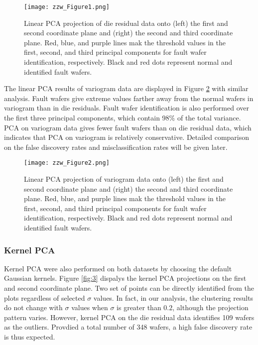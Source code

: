 \documentclass[12pt]{article}
\numberwithin{equation}{section}
\numberwithin{table}{section}
\numberwithin{figure}{section}
\begin{document}
\begin{figure}[!tph]
\begin{centering}
\texttt{[image: zzw\_Figure1.png]}
\par\end{centering}

\caption{Linear PCA projection of die residual data onto (left) the first and
second coordinate plane and (right) the second and third coordinate
plane. Red, blue, and purple lines mak the threshold values in the
first, second, and third principal components for fault wafer identification,
respectively. Black and red dots represent normal and identified fault
wafers.\label{fig:1}}
\end{figure}


The linear PCA results of variogram data are displayed in Figure \ref{fig:2}
with similar analysis. Fault wafers give extreme values farther away
from the normal wafers in variogram than in die residuals. Fault wafer
identification is also performed over the first three principal components,
which contain 98\% of the total variance. PCA on variogram data gives
fewer fault wafers than on die residual data, which indicates that
PCA on variogram is relatively conservative. Detailed comparison on
the false discovery rates and misclassification rates will be given
later.

\begin{figure}[!tph]
\begin{centering}
\texttt{[image: zzw\_Figure2.png]}
\par\end{centering}

\caption{Linear PCA projection of variogram data onto (left) the first and
second coordinate plane and (right) the second and third coordinate
plane. Red, blue, and purple lines mak the threshold values in the
first, second, and third principal components for fault wafer identification,
respectively. Black and red dots represent normal and identified fault
wafers.\label{fig:2}}
\end{figure}



\subsubsection{Kernel PCA}
\hspace{12 pt}
Kernel PCA were also performed on both datasets by choosing the default
Gaussian kernels. Figure \ref{fig:3} dispalys the kernel PCA projections
on the first and second coordinate plane. Two set of points can be
directly identified from the plots regardless of selected $\sigma$
values. In fact, in our analysis, the clustering results do not change
with $\sigma$ values when $\sigma$ is greater than $0.2$, although
the projection pattern varies. However, kernel PCA on the die residual
data identifies 109 wafers as the outliers. Provdied a total number
of 348 wafers, a high false discovery rate is thus expected.
\end{document}
